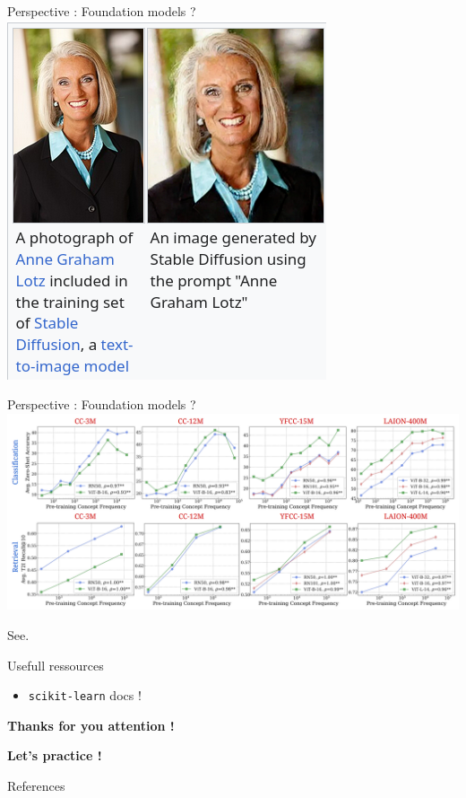 \documentclass{irdbeamer}
\let\oldcite=\cite
\renewcommand{\cite}[1]{\textcolor[rgb]{.5,.5,.7}{\oldcite{#1}}}
\begin{document}
\begin{frame}{Perspective : Foundation models ?}
    \centering
    \includegraphics[width=.3\textwidth]{./figs/stable-diffusion.png}%
\end{frame}

\begin{frame}{Perspective : Foundation models ?}
    \centering
    \includegraphics[width=.8\textwidth]{./figs/no_zero_shot.png}%
    
    \tiny See. \cite{udandarao2024no}
\end{frame}

\begin{frame}{Usefull ressources}

\begin{itemize}
    \item \texttt{scikit-learn} docs !
\end{itemize}
\end{frame}

\begin{frame}[plain]
    \Huge{\textbf{Thanks for you attention !}}
    
    \vfill
    
    \LARGE{\textbf{Let's practice !}}
\end{frame}

\appendix
\begin{frame}[allowframebreaks]{References}
    {\footnotesize \printbibliography[heading=none]}
\end{frame}
\end{document}
